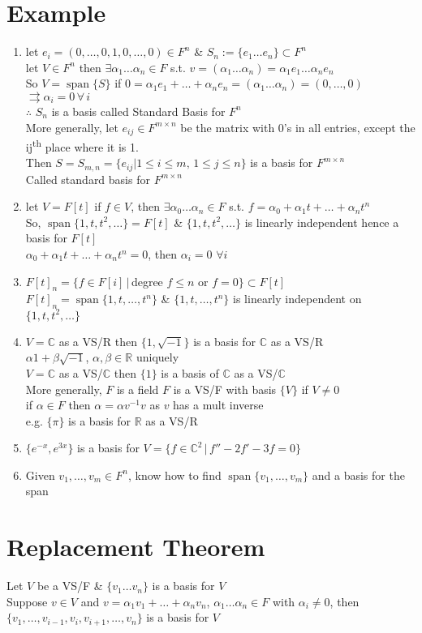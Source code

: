 \documentclass[11pt]{article}
\DeclareMathOperator{\Span}{span}
\begin{document}
\section*{Example}
\begin{enumerate}
	\item let $e_i=(0, \ldots, 0, 1, 0, \ldots, 0)\in F^n$ \& $S_n:=\{e_1\ldots e_n\}\subset F^n$\\
	let $V\in F^n$ then $\exists \alpha_1\ldots \alpha_n\in F$ s.t. $v=(\alpha_1\ldots \alpha_n)=\alpha_1e_1\ldots \alpha_ne_n$\\
	So $V=\Span\{S\}$ if $0=\alpha_1e_1+\ldots+\alpha_ne_n=(\alpha_1\ldots\alpha_n)=(0,\ldots, 0)$\\
	$\rightrightarrows \alpha_i=0\, \forall\, i$\\
	$\therefore$ $S_n$ is a basis called Standard Basis for $F^n$\\
	More generally, let $e_{ij}\in F^{m\times n}$ be the matrix with 0's in all entries, except the ij\textsuperscript{th} place where it is 1.\\
	Then $S=S_{m, n}=\{e_{ij}|1\leq i \leq m, \, 1 \leq j \leq n\}$ is a basis for $F^{m\times n}$\\
	Called standard basis for $F^{m\times n}$
	\item let $V=F[t]$ if $f\in V$, then $\exists \alpha_0\ldots\alpha_n\in F$ s.t. $f=\alpha_0+\alpha_1t+\ldots+\alpha_nt^n$\\
	So, $\Span\{1, t, t^2, \ldots\}=F[t]$ \& $\{1, t, t^2, \ldots\}$ is linearly independent hence a basis for $F[t]$\\
	$\alpha_0+\alpha_1t+\ldots+\alpha_nt^n=0$, then $\alpha_i=0$ $\forall i$
	\item $F[t]_n=\{f\in F[i]\,|\,$degree $f\leq n$ or $f=0\}\subset F[t]$\\
	$F[t]_n=\Span\{1, t, \ldots, t^n\}$ \& $\{1, t, \ldots, t^n\}$ is linearly independent on $\{1, t, t^2, \ldots\}$
	\item $V=\mathbb{C}$ as a VS/R then $\{1, \sqrt{-1}\}$ is a basis for $\mathbb{C}$ as a VS/R\\
	$\alpha 1+\beta\sqrt{-1}$, $\alpha, \beta\in \mathbb{R}$ uniquely\\
	$V=\mathbb{C}$ as a VS/$\mathbb{C}$ then $\{1\}$ is a basis of $\mathbb{C}$ as a VS/$\mathbb{C}$\\
	More generally, $F$ is a field $F$ is a VS/F with basis $\{V\}$ if $V\neq 0$\\
	if $\alpha\in F$ then $\alpha=\alpha v^{-1}v$ as $v$ has a mult inverse\\
	e.g. $\{\pi\}$ is a basis for $\mathbb{R}$ as a VS/R
	\item $\{e^{-x}, e^{3x}\}$ is a basis for $V=\{f\in \mathbb{C}^2\, |\, f''-2f'-3f=0\}$
	\item Given $v_1, \ldots, v_m \in F^n $, know how to find $\Span\{v_1, \ldots, v_m\}$ and a basis for the span
\end{enumerate}

\section{Replacement Theorem}
Let $V$ be a VS/F \& $\{v_1\ldots v_n\}$ is a basis for $V$\\
Suppose $v\in V$ and $v=\alpha_1v_1+\ldots+\alpha_nv_n$, $\alpha_1\ldots\alpha_n\in F$ with $\alpha_i\neq 0$, then $\{v_1, \ldots, v_{i-1}, v_i, v_{i+1}, \ldots, v_n\}$ is a basis for $V$
\end{document}
